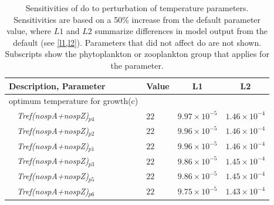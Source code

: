\documentclass[letterpaper,12pt,oneside]{article}\usepackage[]{graphicx}\usepackage[]{color}
\begin{document}
\begin{table}[!tbp]
{\normalsize
\caption{Sensitivities of \ac{do} to perturbation of temperature parameters.  Sensitivities are based on a 50\% increase from the default parameter value, where $L1$ and $L2$ summarize differences in model output from the default (see \cref{l1,l2}).  Parameters that did not affect \ac{do} are not shown.  Subscripts show the phytoplankton or zooplankton group that applies for the parameter.\label{tab:tempsens}} 
\begin{center}
\begin{tabular}{llll}
\hline\hline
\multicolumn{1}{l}{Description, Parameter}&\multicolumn{1}{c}{Value}&\multicolumn{1}{c}{L1}&\multicolumn{1}{c}{L2}\tabularnewline
\hline
{optimum temperature for growth(c)}&&&\tabularnewline
~~\textit{Tref(nospA+nospZ)$_{p4}$}&$22$&$9.97\times 10^{-5}$&$1.46\times 10^{-4}$\tabularnewline
~~\textit{Tref(nospA+nospZ)$_{p2}$}&$22$&$9.96\times 10^{-5}$&$1.46\times 10^{-4}$\tabularnewline
~~\textit{Tref(nospA+nospZ)$_{p1}$}&$22$&$9.96\times 10^{-5}$&$1.46\times 10^{-4}$\tabularnewline
~~\textit{Tref(nospA+nospZ)$_{p3}$}&$22$&$9.86\times 10^{-5}$&$1.45\times 10^{-4}$\tabularnewline
~~\textit{Tref(nospA+nospZ)$_{p5}$}&$22$&$9.86\times 10^{-5}$&$1.45\times 10^{-4}$\tabularnewline
~~\textit{Tref(nospA+nospZ)$_{p6}$}&$22$&$9.75\times 10^{-5}$&$1.43\times 10^{-4}$\tabularnewline
\hline
\end{tabular}\end{center}}

\end{table}
\end{document}
